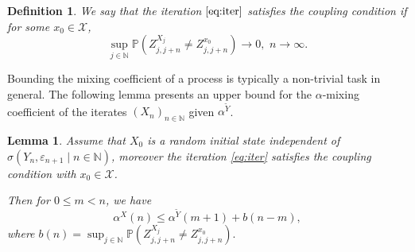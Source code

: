 \documentclass[a4paper,10pt]{article}
\newtheorem{lemma}[theorem]{Lemma}
\newtheorem{definition}[theorem]{Definition}
\newcommand{\N}{\mathbb{N}}
\newcommand{\X}{\mathcal{X}}
\renewcommand{\P}{\mathbb{P}}
\newcommand{\eps}{\varepsilon}
\begin{document}
\begin{definition}\label{def:coupling}	
We say that the iteration $\eqref{eq:iter}$ satisfies the \emph{coupling condition} if for some $x_0\in\X$,
$$
\sup_{j\in\N}\P \left(Z_{j,j+n}^{X_j}\ne Z_{j,j+n}^{x_0}\right)
\to 0,
\,\,
n\to\infty.
$$
\end{definition}

Bounding the mixing coefficient of a process is typically a non-trivial task in general. The following lemma presents an upper bound for the $\alpha$-mixing coefficient of the iterates $(X_n)_{n\in\N}$ given $\alpha^{\tilde{Y}}$. 

\begin{lemma}\label{lem:Mixing}
	Assume that $X_0$ is a random initial state independent of $\sigma (Y_n,\eps_{n+1}\mid n\in\N)$, moreover the iteration \eqref{eq:iter} satisfies the coupling condition with $x_0\in\X$.
	
	Then for $0\le m<n$, we have
	$$
	\alpha^X (n) \le \alpha^{\tilde{Y}} (m+1)+b(n-m),
	$$
	where
	$
	b(n)
	=
	\sup_{j\in\N}\P \left(Z_{j,j+n}^{X_j}\ne Z_{j,j+n}^{x_0}\right).
	$
\end{lemma}
\end{document}
